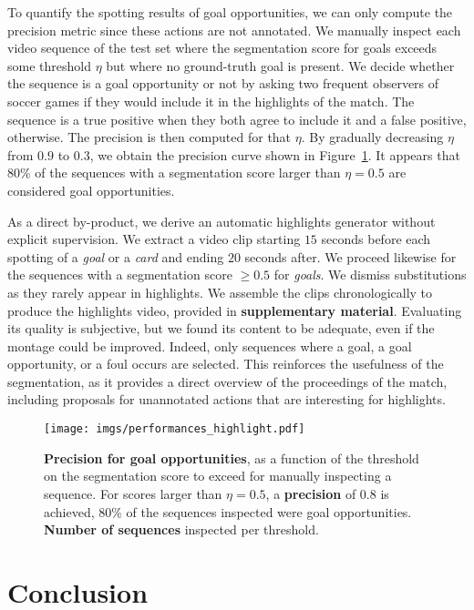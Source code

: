 \documentclass[10pt,twocolumn,letterpaper]{article}
\begin{document}
To quantify the spotting results of goal opportunities, we can only compute the precision metric since these actions are not annotated. We manually inspect each video sequence of the test set where the segmentation score for goals exceeds some threshold $\eta$ but where no ground-truth goal is present. We decide whether the sequence is a goal opportunity or not by asking two frequent observers of soccer games if they would include it in the highlights of the match. The sequence is a true positive when they both agree to include it and a false positive, otherwise. The precision is then computed for that $\eta$. By gradually decreasing $\eta$ from $0.9$ to $0.3$, we obtain the precision curve shown in Figure~\ref{fig:PerformanceHighlight}. It appears that $80\%$ of the sequences with a segmentation score larger than $\eta=0.5$ are considered goal opportunities. 



As a direct by-product, we derive an automatic highlights generator without explicit supervision. We extract a video clip starting $15$ seconds before each spotting of a \emph{goal} or a \emph{card} and ending $20$ seconds after. We proceed likewise for the sequences with a segmentation score $\geq 0.5$ for \emph{goals}. We dismiss substitutions as they rarely appear in highlights. We assemble the clips chronologically to produce the highlights video, provided in \textbf{supplementary material}. Evaluating its quality is subjective, but we found its content to be adequate, even if the montage could be improved. Indeed, only sequences where a goal, a goal opportunity, or a foul occurs are selected. This reinforces the usefulness of the segmentation,  as it provides a direct overview of the proceedings of the match, including proposals for unannotated actions that are interesting for highlights.


\begin{figure}
    \centering
    \texttt{[image: imgs/performances\_highlight.pdf]}
    \caption{\textbf{Precision for goal opportunities}, as a function of the threshold on the segmentation score to exceed for manually inspecting a sequence. For scores larger than $\eta=0.5$, a {\color{anthoorange}\textbf{precision}} of $0.8$ is achieved, \ie $80\%$ of the sequences inspected were goal opportunities. {\color{anthoblue}\textbf{Number of sequences}} inspected per threshold.}
    \label{fig:PerformanceHighlight}
\end{figure} \section{Conclusion}
\label{sec:Conclusion}
\end{document}
